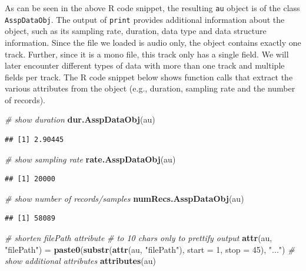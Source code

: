 \documentclass[]{book}
\newenvironment{Shaded}{\begin{snugshade}}{\end{snugshade}}
\newcommand{\CommentTok}[1]{\textcolor[rgb]{0.56,0.35,0.01}{\textit{#1}}}
\newcommand{\DataTypeTok}[1]{\textcolor[rgb]{0.13,0.29,0.53}{#1}}
\newcommand{\DecValTok}[1]{\textcolor[rgb]{0.00,0.00,0.81}{#1}}
\newcommand{\KeywordTok}[1]{\textcolor[rgb]{0.13,0.29,0.53}{\textbf{#1}}}
\newcommand{\NormalTok}[1]{#1}
\newcommand{\StringTok}[1]{\textcolor[rgb]{0.31,0.60,0.02}{#1}}
\theoremstyle{definition}
\theoremstyle{definition}
\theoremstyle{definition}
\theoremstyle{remark}
\begin{document}
As can be seen in the above R code snippet, the resulting \texttt{au}
object is of the class \texttt{AsspDataObj}. The output of
\texttt{print} provides additional information about the object, such as
its sampling rate, duration, data type and data structure information.
Since the file we loaded is audio only, the object contains exactly one
track. Further, since it is a mono file, this track only has a single
field. We will later encounter different types of data with more than
one track and multiple fields per track. The R code snippet below shows
function calls that extract the various attributes from the object
(e.g., duration, sampling rate and the number of records).

\begin{Shaded}
\begin{Highlighting}[]
\CommentTok{# show duration}
\KeywordTok{dur.AsspDataObj}\NormalTok{(au)}
\end{Highlighting}
\end{Shaded}

\begin{verbatim}
## [1] 2.90445
\end{verbatim}

\begin{Shaded}
\begin{Highlighting}[]
\CommentTok{# show sampling rate}
\KeywordTok{rate.AsspDataObj}\NormalTok{(au)}
\end{Highlighting}
\end{Shaded}

\begin{verbatim}
## [1] 20000
\end{verbatim}

\begin{Shaded}
\begin{Highlighting}[]
\CommentTok{# show number of records/samples}
\KeywordTok{numRecs.AsspDataObj}\NormalTok{(au)}
\end{Highlighting}
\end{Shaded}

\begin{verbatim}
## [1] 58089
\end{verbatim}

\begin{Shaded}
\begin{Highlighting}[]
\CommentTok{# shorten filePath attribute}
\CommentTok{# to 10 chars only to prettify output}
\KeywordTok{attr}\NormalTok{(au, }\StringTok{"filePath"}\NormalTok{)  =}\StringTok{ }\KeywordTok{paste0}\NormalTok{(}\KeywordTok{substr}\NormalTok{(}\KeywordTok{attr}\NormalTok{(au, }\StringTok{"filePath"}\NormalTok{),}
                                      \DataTypeTok{start =} \DecValTok{1}\NormalTok{,}
                                      \DataTypeTok{stop =} \DecValTok{45}\NormalTok{), }\StringTok{"..."}\NormalTok{)}
\CommentTok{# show additional attributes}
\KeywordTok{attributes}\NormalTok{(au)}
\end{Highlighting}
\end{Shaded}
\end{document}
